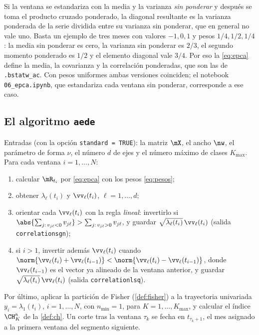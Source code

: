 \begin{observacion}\label{obs:m1}
Si la ventana se estandariza con la media y la varianza \emph{sin ponderar} y después se toma el
producto cruzado ponderado, la diagonal resultante es la varianza ponderada de la serie dividida
entre su varianza sin ponderar, que en general no vale uno. Basta un ejemplo de tres meses con
valores $-1,0,1$ y pesos $1/4,1/2,1/4$: la media sin ponderar es cero, la varianza sin ponderar es
$2/3$, el segundo momento ponderado es $1/2$ y el elemento diagonal vale $3/4$. Por eso la
\cref{eq:epca} define la media, la covarianza y la correlación ponderadas, que son las de
\texttt{.bstatw\_ac}. Con pesos uniformes ambas versiones coinciden; el notebook
\texttt{06\_epca.ipynb}, que estandariza cada ventana sin ponderar, corresponde a ese caso.
\end{observacion}

\subsection{El algoritmo \texttt{aede}}

\begin{algoritmo}\label{alg:aede}
Entradas (con la opción \texttt{standard = TRUE}): la matriz $\mX$, el ancho $\nw$, el parámetro de forma $\nu$, el número $d$ de ejes y
el número máximo de clases $K_{\max}$. Para cada ventana $i=1,\dots,N$:
\begin{enumerate}[label=\arabic*.]
  \item calcular $\mR_{t_i}$ por \cref{eq:epca} con los pesos \cref{eq:pesos};
  \item obtener $\lambda_\ell(t_i)$ y $\vv_\ell(t_i)$, $\ell=1,\dots,d$;
  \item orientar cada $\vv_\ell(t_i)$ con la regla \emph{lineal}: invertirlo si
    $\abs{\sum_{j:\,v_{j\ell}<0}v_{j\ell}}>\sum_{j:\,v_{j\ell}>0}v_{j\ell}$, y guardar
    $\sqrt{\lambda_\ell(t_i)}\,\vv_\ell(t_i)$ (salida \texttt{correlationsgn});
  \item si $i>1$, invertir además $\vv_\ell(t_i)$ cuando
    $\norm{\vv_\ell(t_i)+\vv_\ell(t_{i-1})}<\norm{\vv_\ell(t_i)-\vv_\ell(t_{i-1})}$, donde
    $\vv_\ell(t_{i-1})$ es el vector ya alineado de la ventana anterior, y guardar
    $\sqrt{\lambda_\ell(t_i)}\,\vv_\ell(t_i)$ (salida \texttt{correlationlsq}).
\end{enumerate}
Por último, aplicar la partición de Fisher (\cref{def:fisher}) a la trayectoria univariada
$y_i=\lambda_1(t_i)$, $i=1,\dots,N$, con $n_{\min}=1$, para $K=1,\dots,K_{\max}$, y calcular el
índice $\CH^{\mathrm a}_K$ de la \cref{def:ch}. Un corte tras la ventana $\tau_k$ se fecha en
$t_{\tau_k+1}$, el mes asignado a la primera ventana del segmento siguiente.
\end{algoritmo}

